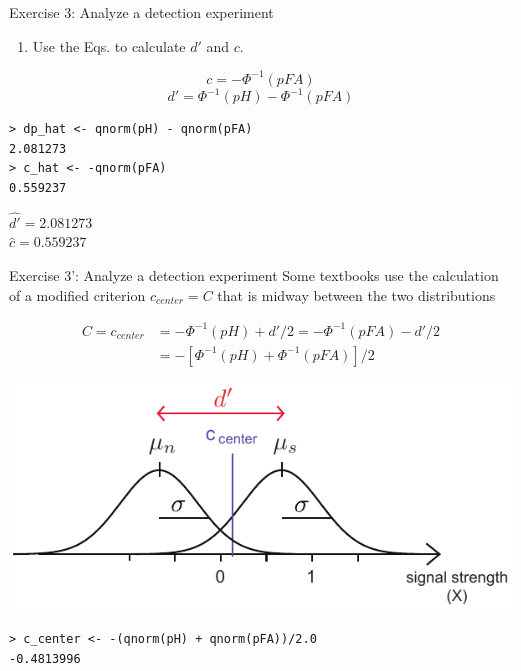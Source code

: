 \documentclass[10pt]{beamer}
\begin{document}
\begin{frame}[fragile]{Exercise 3: Analyze a detection experiment}
\begin{enumerate}
\item Use the Eqs. to calculate $d'$ and $c$.
\end{enumerate}

\begin{block}{}
\begin{equation*}
c = -\Phi^{-1}(pFA)
\end{equation*}
\begin{equation*}
d'= \Phi^{-1}(pH) - \Phi^{-1}(pFA)
\end{equation*}
\end{block}

\pause
\begin{verbatim}
> dp_hat <- qnorm(pH) - qnorm(pFA)
2.081273
> c_hat <- -qnorm(pFA)
0.559237
\end{verbatim}

\begin{center}
$\hat{d'} = 2.081273$\\
$\hat{c} = 0.559237$
\end{center}

\end{frame}

\begin{frame}[fragile]{Exercise 3': Analyze a detection experiment}
Some textbooks use the calculation of a modified criterion $c_{center} = C$ that is midway between the two distributions

\begin{align*}
C = c_{center} & = -\Phi^{-1}(pH) + d'/2 = -\Phi^{-1}(pFA) - d'/2 \\
& = -[\Phi^{-1}(pH) + \Phi^{-1}(pFA)]/2 
\end{align*}

\begin{center}
\includegraphics[scale=0.8]{figs/c_center.pdf}
\end{center}

\pause
\begin{verbatim}
> c_center <- -(qnorm(pH) + qnorm(pFA))/2.0
-0.4813996
\end{verbatim}


\end{frame}
\end{document}
